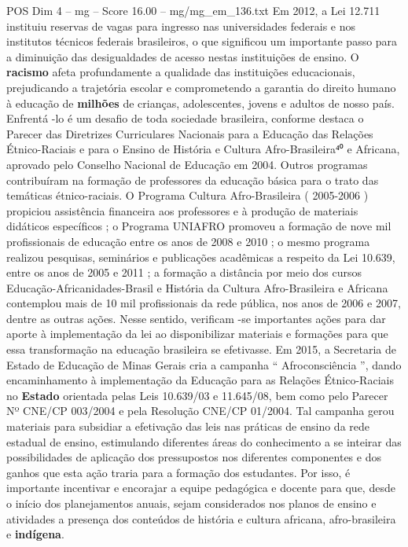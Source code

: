 \begin{textsample}{POS Dim 4 – mg – Score 16.00 – mg/mg\_em\_136.txt}
Em 2012, a Lei 12.711 instituiu reservas de vagas para ingresso nas universidades federais e nos institutos técnicos federais brasileiros, o que significou um importante passo para a diminuição das desigualdades de acesso nestas instituições de ensino.
O \textbf{racismo} afeta profundamente a qualidade das instituições educacionais, prejudicando a trajetória escolar e comprometendo a garantia do direito humano à educação de \textbf{milhões} de crianças, adolescentes, jovens e adultos de nosso país.
Enfrentá -lo é um desafio de toda sociedade brasileira, conforme destaca o Parecer das Diretrizes Curriculares Nacionais para a Educação das Relações Étnico-Raciais e para o Ensino de História e Cultura Afro-Brasileira⁴⁰ e Africana, aprovado pelo Conselho Nacional de Educação em 2004.
Outros programas contribuíram na formação de professores da educação básica para o trato das temáticas étnico-raciais.
O Programa Cultura Afro-Brasileira ( 2005-2006 ) propiciou assistência financeira aos professores e à produção de materiais didáticos específicos ; o Programa UNIAFRO promoveu a formação de nove mil profissionais de educação entre os anos de 2008 e 2010 ; o mesmo programa realizou pesquisas, seminários e publicações acadêmicas a respeito da Lei 10.639, entre os anos de 2005 e 2011 ; a formação a distância por meio dos cursos Educação-Africanidades-Brasil e História da Cultura Afro-Brasileira e Africana contemplou mais de 10 mil profissionais da rede pública, nos anos de 2006 e 2007, dentre as outras ações.
Nesse sentido, verificam -se importantes ações para dar aporte à implementação da lei ao disponibilizar materiais e formações para que essa transformação na educação brasileira se efetivasse.
Em 2015, a Secretaria de Estado de Educação de Minas Gerais cria a campanha “ Afroconsciência ”, dando encaminhamento à implementação da Educação para as Relações Étnico-Raciais no \textbf{Estado} orientada pelas Leis 10.639/03 e 11.645/08, bem como pelo Parecer Nº CNE/CP 003/2004 e pela Resolução CNE/CP 01/2004.
Tal campanha gerou materiais para subsidiar a efetivação das leis nas práticas de ensino da rede estadual de ensino, estimulando diferentes áreas do conhecimento a se inteirar das possibilidades de aplicação dos pressupostos nos diferentes componentes e dos ganhos que esta ação traria para a formação dos estudantes.
Por isso, é importante incentivar e encorajar a equipe pedagógica e docente para que, desde o início dos planejamentos anuais, sejam considerados nos planos de ensino e atividades a presença dos conteúdos de história e cultura africana, afro-brasileira e \textbf{indígena}.

\end{textsample}
